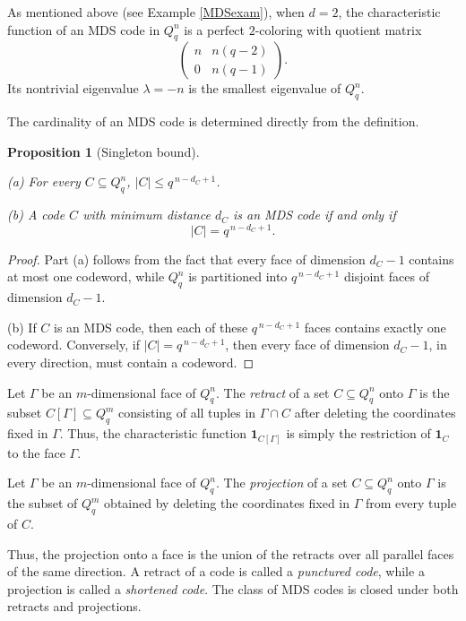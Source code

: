 \documentclass[11pt]{article}
\newtheorem{claim}{Proposition}[section]
\theoremstyle{definition}
\begin{document}
{{{As mentioned above (see Example \ref{MDSexam}), when $d=2$, the
characteristic function of an MDS code in $Q_q^n$ is a perfect
$2$-coloring with quotient matrix
\[
\left(
\begin{array}{cc}
n & n(q-2)\\
0 & n(q-1)
\end{array}
\right).
\]
Its nontrivial eigenvalue $\lambda=-n$ is the smallest eigenvalue of
$Q_q^n$.

The cardinality of an MDS code is determined directly from the
definition.

\begin{claim}[Singleton bound]\label{proSingl}\quad

{\rm (a)} For every $C\subseteq Q_q^n$,
$ |C|\le q^{\,n-d_C+1}$.


{\rm (b)} A code $C$ with minimum distance $d_C$ is an {\rm MDS} code
if and only if
\[
|C|=q^{\,n-d_C+1}.
\]
\end{claim}

\begin{proof}
Part (a) follows from the fact that every face of dimension
$d_C-1$ contains at most one codeword, while
$Q_q^n$ is partitioned into $q^{\,n-d_C+1}$ disjoint faces of
dimension $d_C-1$.

(b) If $C$ is an MDS code, then each of these
$q^{\,n-d_C+1}$ faces contains exactly one codeword.
Conversely, if $|C|=q^{\,n-d_C+1}$, then every face of
dimension $d_C-1$, in every direction, must contain a codeword.
\end{proof}

Let $\Gamma$ be an $m$-dimensional face of $Q_q^n$.
The {\sl retract} of a set $C\subseteq Q_q^n$ onto $\Gamma$
is the subset $C[\Gamma]\subseteq Q_q^m$ consisting of all
tuples in $\Gamma\cap C$ after deleting the coordinates fixed in
$\Gamma$.
Thus, the characteristic function ${\mathbf 1}_{C[\Gamma]}$ is simply the
restriction of ${\mathbf 1}_C$ to the face $\Gamma$.

Let $\Gamma$ be an $m$-dimensional face of $Q_q^n$.
The {\sl projection} of a set $C\subseteq Q_q^n$ onto $\Gamma$
is the subset of $Q_q^m$ obtained by deleting the coordinates fixed
in $\Gamma$ from every tuple of $C$.

Thus, the projection onto a face is the union of the retracts over all
parallel faces of the same direction. A retract of a code is called a
{\sl punctured code}, while a projection is called a {\sl shortened
code}. The class of MDS codes is closed under both retracts and
projections.

}}}
\end{document}
